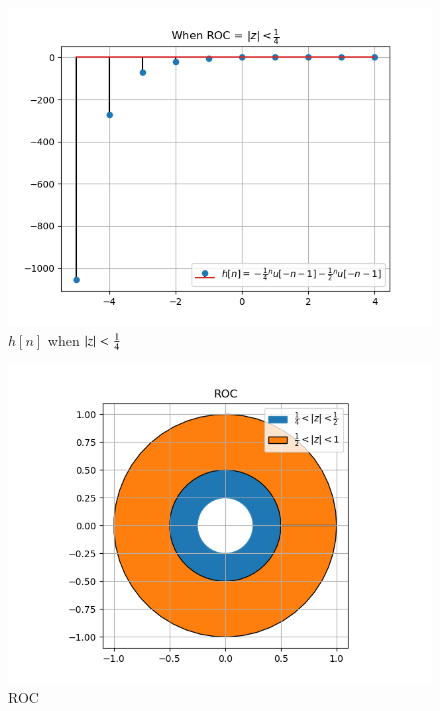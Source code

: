 \documentclass[journal,12pt,twocolumn]{IEEEtran}
\begin{document}
  \begin{figure}[!ht]
\centering
 \includegraphics[width=\columnwidth]{Graphs/S2.png}
 \caption{$h[n]$ when $\left\vert z\right\vert < \frac{1}{4}$} \end{figure}
 
\begin{figure}[!ht]
\centering
 \includegraphics[width=\columnwidth]{Graphs/ROC.png}
 \caption{ROC}
 \end{figure}
 
\end{document}
